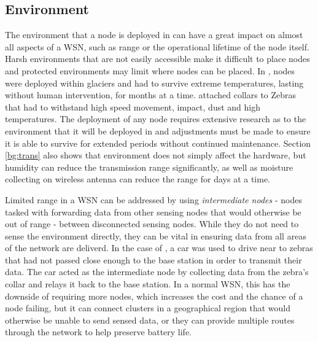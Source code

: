 \subsection{Environment}
	The environment that a node is deployed in can have a great impact on almost all aspects of a WSN, such as range or the operational lifetime of the node itself. Harsh environments that are not easily accessible make it difficult to place nodes and protected environments may limit where nodes can be placed. 
	In \cite{Martinez2004}, nodes were deployed within glaciers and had to survive extreme temperatures, lasting without human intervention, for months at a time. \cite{Martonosi2003} attached collars to Zebras that had to withstand high speed movement, impact, dust and high temperatures. The deployment of any node requires extensive research as to the environment that it will be deployed in and adjustments must be made to ensure it is able to survive for extended periods without continued maintenance.
	Section \ref{bg:trans} also shows that environment does not simply affect the hardware, but humidity can reduce the transmission range significantly, as well as moisture collecting on wireless antenna can reduce the range for days at a time.

	Limited range in a WSN can be addressed by using \textit{intermediate nodes} - nodes tasked with forwarding data from other sensing nodes that would otherwise be out of range - between disconnected sensing nodes. While they do not need to sense the environment directly, they can be vital in ensuring data from all areas of the network are deliverd. In the case of \cite{Martonosi2003}, a car was used to drive near to zebras that had not passed close enough to the base station in order to transmit their data. The car acted as the intermediate node by collecting data from the zebra's collar and relays it back to the base station. In a normal WSN, this has the downside of requiring more nodes, which increases the cost and the chance of a node failing, but it can connect clusters in a geographical region that would otherwise be unable to send sensed data, or they can provide multiple routes through the network to help preserve battery life.


